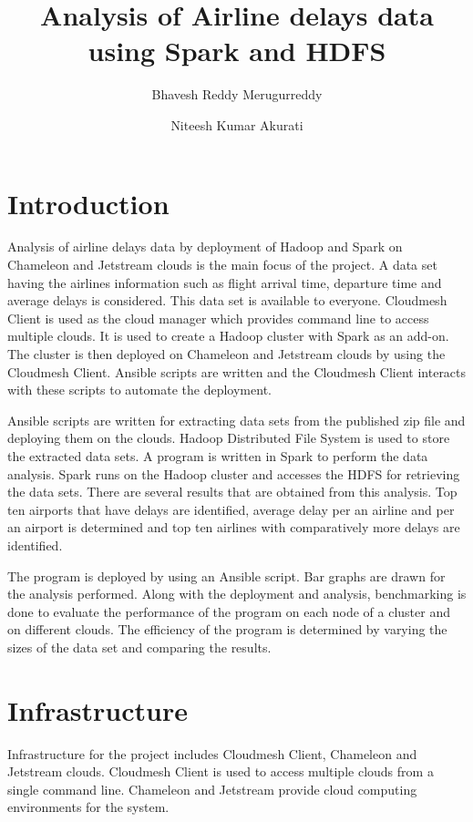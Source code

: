 \documentclass[9pt,twocolumn,twoside]{../../styles/osajnl}
\title{Analysis of Airline delays data using Spark and HDFS}
\author[1,*]{Bhavesh Reddy Merugurreddy}
\author[1,**]{Niteesh Kumar Akurati}
\affil[1]{School of Informatics and Computing, Bloomington, IN 47408, U.S.A.}
\affil[*]{Corresponding authors:bmerugur@iu.edu}
\affil[**]{Corresponding authors: akuratin@iu.edu}
\begin{document}
\maketitle



\section{Introduction}

Analysis of airline delays data by deployment of Hadoop and Spark on
Chameleon and Jetstream clouds is the main focus of the project. A
data set having the airlines information such as flight arrival time,
departure time and average delays is considered. This data set is
available to everyone. Cloudmesh Client is used as the cloud manager
which provides command line to access multiple clouds. It is used to
create a Hadoop cluster with Spark as an add-on. The cluster is then
deployed on Chameleon and Jetstream clouds by using the Cloudmesh
Client. Ansible scripts are written and the Cloudmesh Client interacts
with these scripts to automate the deployment.

Ansible scripts are written for extracting data sets from the
published zip file and deploying them on the clouds. Hadoop
Distributed File System is used to store the extracted data sets. A
program is written in Spark to perform the data analysis. Spark runs
on the Hadoop cluster and accesses the HDFS for retrieving the data
sets. There are several results that are obtained from this
analysis. Top ten airports that have delays are identified, average
delay per an airline and per an airport is determined and top ten
airlines with comparatively more delays are identified.

The program is deployed by using an Ansible script. Bar graphs are
drawn for the analysis performed. Along with the deployment and
analysis, benchmarking is done to evaluate the performance of the
program on each node of a cluster and on different clouds. The
efficiency of the program is determined by varying the sizes of the
data set and comparing the results.

\section{Infrastructure} 

Infrastructure for the project includes Cloudmesh Client, Chameleon
and Jetstream clouds. Cloudmesh Client is used to access multiple
clouds from a single command line. Chameleon and Jetstream provide
cloud computing environments for the system.
\end{document}
